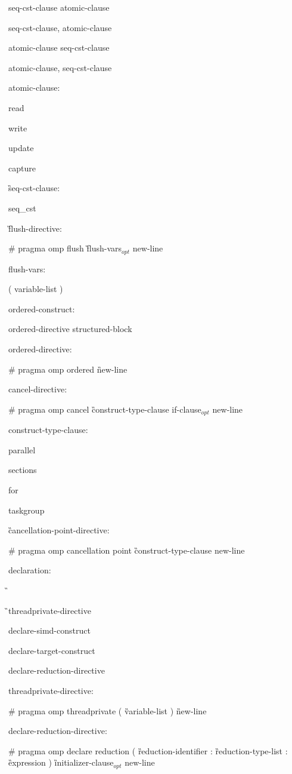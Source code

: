 {\I seq-cst-clause atomic-clause

\I seq-cst-clause, atomic-clause

\I atomic-clause seq-cst-clause 

\I atomic-clause, seq-cst-clause 

atomic-clause:

\C\I read

\I write

\I update

\I capture

\G seq-cst-clause:

\C\I seq\_cst

\G flush-directive:

\C\I \# pragma omp flush \G flush-vars$_{opt}$ new-line

flush-vars:

\I ( variable-list )

ordered-construct:

\I ordered-directive structured-block

ordered-directive:

\C\I \# pragma omp ordered \G new-line

cancel-directive:

\C\I \# pragma omp cancel \G construct-type-clause if-clause$_{opt}$ new-line

construct-type-clause:

\C\I parallel

\I sections

\I for

\I taskgroup

\G cancellation-point-directive:

\C\I \# pragma omp cancellation point \G construct-type-clause new-line

declaration:

\G{}

\G\I threadprivate-directive

\I declare-simd-construct

\I declare-target-construct

\I declare-reduction-directive

threadprivate-directive:

\C\I \# pragma omp threadprivate ( \G variable-list \C ) \G new-line

declare-reduction-directive:

\C\I \# pragma omp declare reduction ( \G reduction-identifier \C : \G reduction-type-list \C : \G expression \C ) \G initializer-clause$_{opt}$ new-line

}
